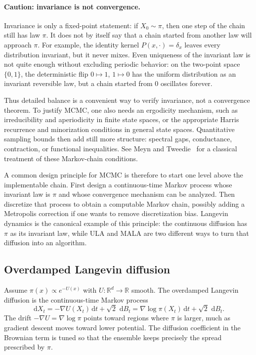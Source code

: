 \documentclass{amsart}
\numberwithin{equation}{section}
\theoremstyle{plain}
\theoremstyle{definition}
\theoremstyle{remark}
\newcommand{\R}{\mathbb{R}}
\newcommand{\dd}{\,\mathrm{d}}
\begin{document}
\paragraph{Caution: invariance is not convergence.}
Invariance is only a fixed-point statement: if $X_0\sim\pi$, then one step of
the chain still has law $\pi$.  It does not by itself say that a chain started
from another law will approach $\pi$.  For example, the identity kernel
$P(x,\cdot)=\delta_x$ leaves every distribution invariant, but it never mixes.
Even uniqueness of the invariant law is not quite enough without excluding
periodic behavior: on the two-point space $\{0,1\}$, the deterministic flip
$0\mapsto1$, $1\mapsto0$ has the uniform distribution as an invariant reversible
law, but a chain started from $0$ oscillates forever.

Thus detailed balance is a convenient way to verify invariance, not a
convergence theorem.  To justify MCMC, one also needs an ergodicity mechanism,
such as irreducibility and aperiodicity in finite state spaces, or the
appropriate Harris recurrence and minorization conditions in general state
spaces.  Quantitative sampling bounds then add still more structure: spectral
gaps, conductance, contraction, or functional inequalities.  See Meyn and
Tweedie~\cite{meyn2009markov} for a classical treatment of these Markov-chain
conditions.

A common design principle for MCMC is therefore to start one level above the
implementable chain.  First design a continuous-time Markov process whose
invariant law is $\pi$ and whose convergence mechanism can be analyzed.  Then
discretize that process to obtain a computable Markov chain, possibly adding a
Metropolis correction if one wants to remove discretization bias.  Langevin
dynamics is the canonical example of this principle: the continuous diffusion
has $\pi$ as its invariant law, while ULA and MALA are two different ways to
turn that diffusion into an algorithm.

\subsection{Overdamped Langevin diffusion}

Assume $\pi(x)\propto e^{-U(x)}$ with $U:\R^d\to\R$ smooth.  The overdamped
Langevin diffusion is the continuous-time Markov process
\begin{equation}\label{eq:langevin}
    \dd X_t = -\nabla U(X_t)\dd t+\sqrt{2}\,\dd B_t
    = \nabla\log\pi(X_t)\dd t+\sqrt{2}\,\dd B_t.
\end{equation}
The drift
$-\nabla U=\nabla\log\pi$ points toward regions where $\pi$ is larger, much as
gradient descent moves toward lower potential.  The diffusion coefficient in
the Brownian term is tuned so that the ensemble keeps precisely the spread
prescribed by $\pi$.
\end{document}
